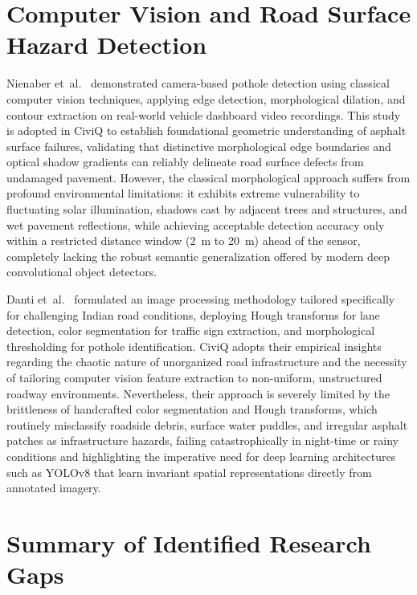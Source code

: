 \documentclass[12pt,a4paper]{report}
\begin{document}
\section{Computer Vision and Road Surface Hazard Detection}

Nienaber et~al.~\cite{ref_nienaber2015_potholes} demonstrated camera-based pothole detection using classical computer vision techniques, applying edge detection, morphological dilation, and contour extraction on real-world vehicle dashboard video recordings. This study is adopted in CiviQ to establish foundational geometric understanding of asphalt surface failures, validating that distinctive morphological edge boundaries and optical shadow gradients can reliably delineate road surface defects from undamaged pavement. However, the classical morphological approach suffers from profound environmental limitations: it exhibits extreme vulnerability to fluctuating solar illumination, shadows cast by adjacent trees and structures, and wet pavement reflections, while achieving acceptable detection accuracy only within a restricted distance window (2~m to 20~m) ahead of the sensor, completely lacking the robust semantic generalization offered by modern deep convolutional object detectors.

Danti et~al.~\cite{ref_danti2012_potholes} formulated an image processing methodology tailored specifically for challenging Indian road conditions, deploying Hough transforms for lane detection, color segmentation for traffic sign extraction, and morphological thresholding for pothole identification. CiviQ adopts their empirical insights regarding the chaotic nature of unorganized road infrastructure and the necessity of tailoring computer vision feature extraction to non-uniform, unstructured roadway environments. Nevertheless, their approach is severely limited by the brittleness of handcrafted color segmentation and Hough transforms, which routinely misclassify roadside debris, surface water puddles, and irregular asphalt patches as infrastructure hazards, failing catastrophically in night-time or rainy conditions and highlighting the imperative need for deep learning architectures such as YOLOv8 that learn invariant spatial representations directly from annotated imagery.

\section{Summary of Identified Research Gaps}
\end{document}
